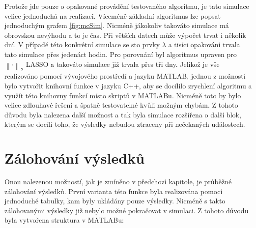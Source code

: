 \documentclass[FM,BP]{tulthesis}
\begin{document}
Protože jde pouze o opakované provádění testovaného algoritmu, je tato simulace velice jednoduchá na realizaci. Víceméně základní algoritmus lze popsat jednoduchým grafem \ref{fig:mcSim}. Nicméně jákokoliv takováto simulace má obrovskou nevýhodu a to je čas. Při větších datech může výpočet trvat i několik dní. V případě této konkrétní simulace se sto prvky $\lambda$ a tisíci opakování trvala tato simulace přes jedenáct hodin. Pro porovnání byl algoritmus upraven pro $\left\| \cdot \right\|_2 $ LASSO a takováto simulace již trvala přes tři dny. Jelikož je vše realizováno pomocí vývojového prostředí a jazyku MATLAB, jednou z možností bylo vytvořit knihovní funkce v jazyku C++, aby se docílilo zrychlení algoritmu a využít této knihovny funkcí místo skriptů v MATLABu. Nicméně toto by bylo velice zdlouhavé řešení a špatně testovatelné kvůli možným chybám. Z tohoto důvodu byla nalezena další možnost a tak byla simulace rozšířena o další blok, kterým se docílí toho, že výsledky nebudou ztraceny při nečekaných událostech.

\section{Zálohování výsledků}
Onou nalezenou možností, jak je zmíněno v předchozí kapitole, je průběžné zálohování výsledků. První varianta této funkce byla realizována pomocí jednoduché tabulky, kam byly ukládány pouze výsledky. Nicméně s takto zálohovanými výsledky již nebylo možné pokračovat v simulaci. Z tohoto důvodu byla vytvořena struktura v MATLABu: 
\end{document}
